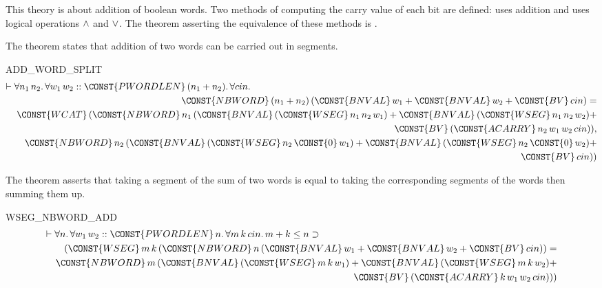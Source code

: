 This theory is about addition of boolean words. Two methods of
computing the carry value of each bit are defined:  uses
addition and  uses logical operations $\AND$ and $\OR$.
The theorem asserting the equivalence of these methods is
.

The theorem  states that addition of two words
can be carried out in segments.
\begin{holthm}{ADD_WORD_SPLIT}
\begin{eqnarray*}
\lefteqn{\THM \FORALL n_{1} \,n_{2}\DOT
        \FORALL w_{1} \,w_{2}\RESDOT \CONST{PWORDLEN}
                                        \,(n_{1} + n_{2})\DOT
           \FORALL cin\DOT} \\
 & & \CONST{NBWORD} \,(n_{1} + n_{2})
                 \,(\CONST{BNVAL} \,w_{1} +
                    \CONST{BNVAL} \,w_{2} +
                    \CONST{BV} \,cin) = \\
 & & \CONST{WCAT} \,(\CONST{NBWORD} \,n_{1}
         \,(\CONST{BNVAL} \,(\CONST{WSEG} \,n_{1} \,n_{2} \,w_{1}) +
           \CONST{BNVAL} \,(\CONST{WSEG} \,n_{1} \,n_{2} \,w_{2}) + \\
 & & \qquad \CONST{BV} \,(\CONST{ACARRY} \,n_{2} \,w_{1} \,w_{2} \,cin)),\\
 & & \quad \CONST{NBWORD} \,n_{2}
         \,(\CONST{BNVAL} \,(\CONST{WSEG} \,n_{2} \,\CONST{0} \,w_{1}) +
            \CONST{BNVAL} \,(\CONST{WSEG} \,n_{2} \,\CONST{0} \,w_{2}) +\\
 & & \qquad \CONST{BV} \,cin))
\end{eqnarray*}
\end{holthm}
The theorem  asserts that taking a segment of
the sum of two words is equal to taking the corresponding segments of
the words then summing them up.
\begin{holthm}{WSEG_NBWORD_ADD}
\begin{eqnarray*}
\lefteqn{\THM \FORALL n\DOT
        \FORALL w_{1} \,w_{2}\RESDOT \CONST{PWORDLEN} \,n\DOT
           \FORALL m \,k \,cin\DOT
              m + k \LEE  n \IMP } \\
 & & (\CONST{WSEG} \,m \,k
      \,(\CONST{NBWORD} \,n \,
        (\CONST{BNVAL} \,w_{1} + \CONST{BNVAL} \,w_{2} + \CONST{BV} \,cin)) =\\
 & & \CONST{NBWORD} \,m \,(\CONST{BNVAL} \,(\CONST{WSEG} \,m \,k \,w_{1}) +
                           \CONST{BNVAL} \,(\CONST{WSEG} \,m \,k \,w_{2}) +\\
 & & \qquad \CONST{BV} \,(\CONST{ACARRY} \,k \,w_{1} \,w_{2} \,cin)))
\end{eqnarray*}
\end{holthm}

